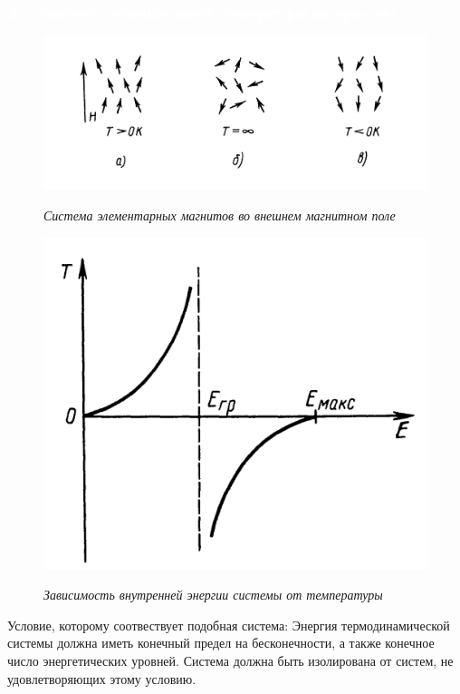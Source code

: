 \documentclass[aspectratio=169]{beamer}
\begin{document}
\begin{frame}
\frametitle{\textcolor{white}{Достижимость отрицательной температуры на практике}} 

\begin{figure}
\centering
\begin{minipage}{.5\textwidth}
  \centering
  \includegraphics[width=.805\linewidth]{magnete}

	\small{\textit{Система элементарных магнитов во внешнем магнитном поле}}
  \label{fig:test1}
\end{minipage}%
\begin{minipage}{.5\textwidth}
  \centering
  \includegraphics[width=.72\linewidth]{graph}

	\small{\textit{Зависимость внутренней энергии системы от температуры}}
  \label{fig:test2}
\end{minipage}
\end{figure}

Условие, которому соотвествует подобная система:
Энергия термодинамической системы должна иметь конечный предел на бесконечности, а также конечное число энергетических уровней. Система должна быть изолирована от систем, не удовлетворяющих этому условию. 
\end{frame}
\end{document}
